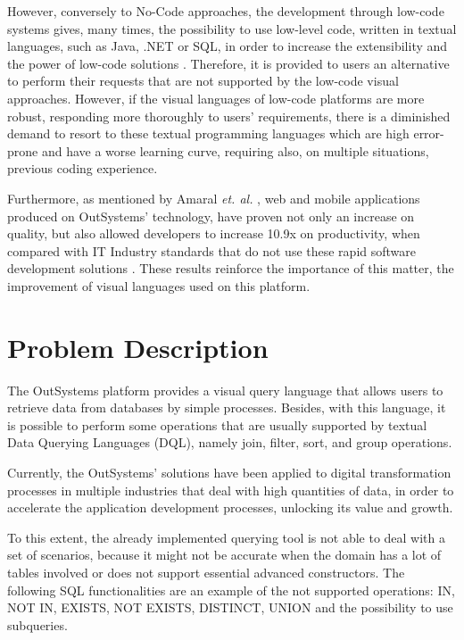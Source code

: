 However, conversely to No-Code approaches, the development through low-code systems gives, many times, the possibility to use low-level code, written in textual languages, such as Java, .NET or SQL, in order to increase the extensibility and the power of low-code solutions \cite{outsystems_lowcodeVsNocode}. Therefore, it is provided to users an alternative to perform their requests that are not supported by the low-code visual approaches. However, if the visual languages of low-code platforms are more robust, responding more thoroughly to users’ requirements, there is a diminished demand to resort to these textual programming languages which are high error-prone and have a worse learning curve, requiring also, on multiple situations, previous coding experience.

Furthermore, as mentioned by  Amaral \textit{et. al.} \cite{improvingTheDeveloperExperienceWithALowCodeProcessModellingLanguage}, web and mobile applications produced on OutSystems’ technology, have proven not only an increase on quality, but also allowed developers to increase 10.9x on productivity, when compared with  IT Industry standards that do not use these rapid software development solutions \cite{outByNumbers2013}. These results reinforce the importance of this matter, the improvement of visual languages used on this platform.


\section{Problem Description}
\label{sec:problem_description}
The OutSystems platform provides a visual query language that allows users to retrieve data from databases by simple processes. Besides, with this language, it is possible to perform some operations that are usually supported by textual Data Querying Languages (DQL), namely join, filter, sort, and group operations.

Currently, the OutSystems’ solutions have been applied to digital transformation processes in multiple industries that deal with high quantities of data, in order to accelerate the application development processes, unlocking its value and growth.

To this extent, the already implemented querying tool is not able to deal with a set of scenarios, because it might not be accurate when the domain has a lot of tables involved or does not support essential advanced constructors. The following SQL functionalities are an example of the not supported operations: IN, NOT IN, EXISTS, NOT EXISTS, DISTINCT, UNION and the possibility to use subqueries.

